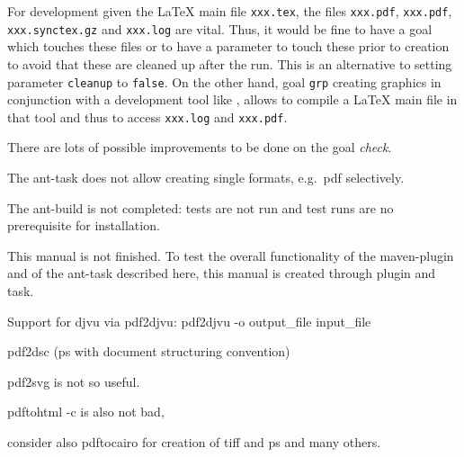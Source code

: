 For development given the \LaTeX{} main file \texttt{xxx.tex}, 
the files \texttt{xxx.pdf}, \texttt{xxx.pdf}, \texttt{xxx.synctex.gz} 
and \texttt{xxx.log} are vital. 
Thus, it would be fine to have a goal which touches these files 
or to have a parameter to touch these prior to creation 
to avoid that these are cleaned up after the run. 
This is an alternative to setting parameter \texttt{cleanup} to \texttt{false}. 
On the other hand, goal \texttt{grp} creating graphics 
in conjunction with a development tool like , 
allows to compile a \LaTeX{} main file in that tool 
and thus to access \texttt{xxx.log} and \texttt{xxx.pdf}. 

There are lots of possible improvements to be done on the goal \emph{check}. 


The ant-task does not allow creating single formats, e.g.~pdf selectively. 

The ant-build is not completed: tests are not run and 
test runs are no prerequisite for installation. 

This manual is not finished. 
To test the overall functionality of the maven-plugin and of the ant-task 
described here, this manual is created through plugin and task. 

Support for djvu via pdf2djvu: 
pdf2djvu -o output\_file input\_file

pdf2dsc
(ps with document structuring convention) 

pdf2svg is not so useful. 

pdftohtml -c is also not bad, 

consider also pdftocairo for creation of tiff and ps and many others. 
